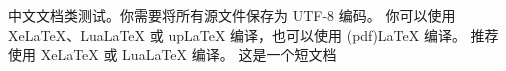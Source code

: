 \documentclass[UTF8]{ctexart}
\begin{document}
中文文档类测试。你需要将所有源文件保存为 UTF-8 编码。
你可以使用 XeLaTeX、LuaLaTeX 或 upLaTeX 编译，也可以使用 (pdf)LaTeX 编译。
推荐使用 XeLaTeX 或 LuaLaTeX 编译。
这是一个短文档
\end{document}
